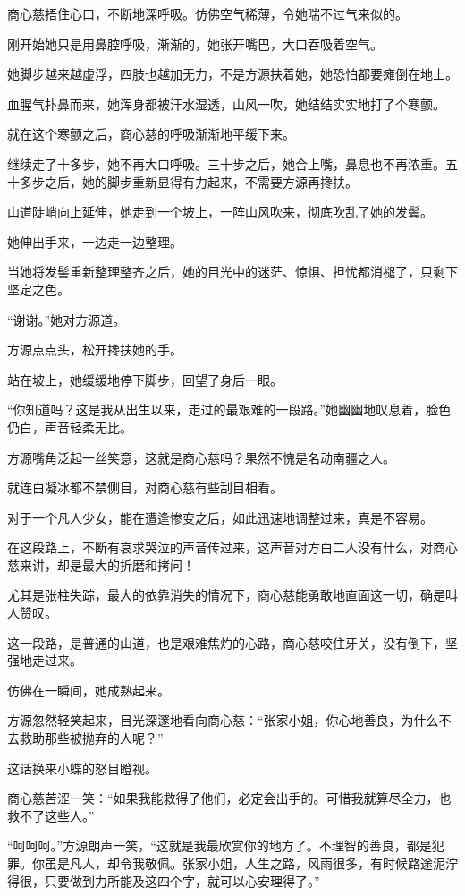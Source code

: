 \begin{this_body}
商心慈捂住心口，不断地深呼吸。仿佛空气稀薄，令她喘不过气来似的。

刚开始她只是用鼻腔呼吸，渐渐的，她张开嘴巴，大口吞吸着空气。

她脚步越来越虚浮，四肢也越加无力，不是方源扶着她，她恐怕都要瘫倒在地上。

血腥气扑鼻而来，她浑身都被汗水湿透，山风一吹，她结结实实地打了个寒颤。

就在这个寒颤之后，商心慈的呼吸渐渐地平缓下来。

继续走了十多步，她不再大口呼吸。三十步之后，她合上嘴，鼻息也不再浓重。五十多步之后，她的脚步重新显得有力起来，不需要方源再搀扶。

山道陡峭向上延伸，她走到一个坡上，一阵山风吹来，彻底吹乱了她的发鬓。

她伸出手来，一边走一边整理。

当她将发髻重新整理整齐之后，她的目光中的迷茫、惊惧、担忧都消褪了，只剩下坚定之色。

“谢谢。”她对方源道。

方源点点头，松开搀扶她的手。

站在坡上，她缓缓地停下脚步，回望了身后一眼。

“你知道吗？这是我从出生以来，走过的最艰难的一段路。”她幽幽地叹息着，脸色仍白，声音轻柔无比。

方源嘴角泛起一丝笑意，这就是商心慈吗？果然不愧是名动南疆之人。

就连白凝冰都不禁侧目，对商心慈有些刮目相看。

对于一个凡人少女，能在遭逢惨变之后，如此迅速地调整过来，真是不容易。

在这段路上，不断有哀求哭泣的声音传过来，这声音对方白二人没有什么，对商心慈来讲，却是最大的折磨和拷问！

尤其是张柱失踪，最大的依靠消失的情况下，商心慈能勇敢地直面这一切，确是叫人赞叹。

这一段路，是普通的山道，也是艰难焦灼的心路，商心慈咬住牙关，没有倒下，坚强地走过来。

仿佛在一瞬间，她成熟起来。

方源忽然轻笑起来，目光深邃地看向商心慈：“张家小姐，你心地善良，为什么不去救助那些被抛弃的人呢？”

这话换来小蝶的怒目瞪视。

商心慈苦涩一笑：“如果我能救得了他们，必定会出手的。可惜我就算尽全力，也救不了这些人。”

“呵呵呵。”方源朗声一笑，“这就是我最欣赏你的地方了。不理智的善良，都是犯罪。你虽是凡人，却令我敬佩。张家小姐，人生之路，风雨很多，有时候路途泥泞得很，只要做到力所能及这四个字，就可以心安理得了。”


\end{this_body}
